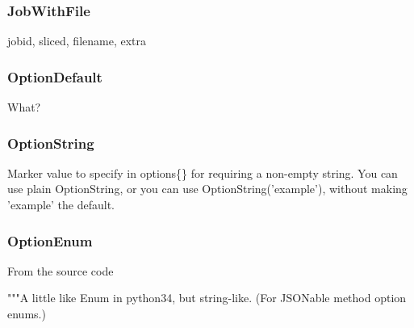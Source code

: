 \subsubsection{JobWithFile}
\begin{python}

jobid, sliced, filename, extra


\subsubsection{OptionDefault}
What?


\subsubsection{OptionString}
Marker value to specify in options\{\} for requiring a non-empty string.
You can use plain OptionString, or you can use
OptionString('example'), without making 'example' the default.
    

\subsubsection{OptionEnum}
From the source code

\begin{python}
    """A little like Enum in python34, but string-like.                                                                                                                                                                           
    (For JSONable method option enums.)                                                                                                                                                                                           
                                                                                                                                                                                                                                  

\end{python}
\end{python}
